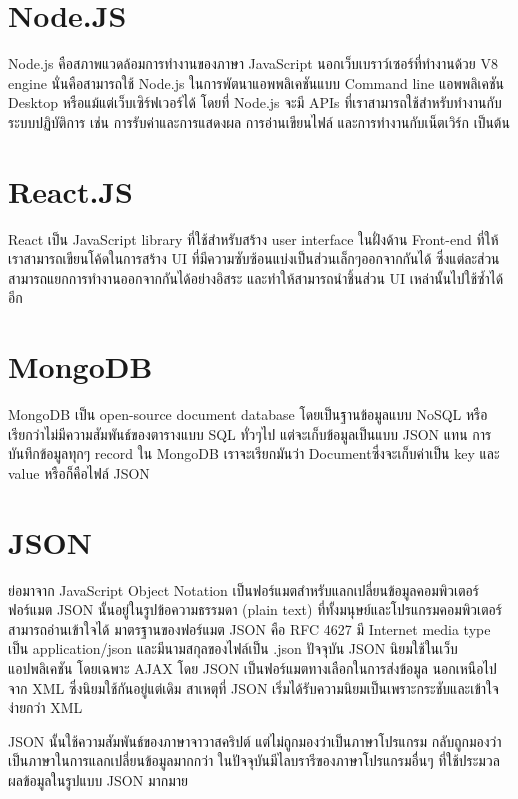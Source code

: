 \section{Node.JS}
Node.js คือสภาพแวดล้อมการทำงานของภาษา JavaScript นอกเว็บเบราว์เซอร์ที่ทำงานด้วย V8 engine นั่นคือสามารถใช้ Node.js ในการพัตนาแอพพลิเคชันแบบ Command line แอพพลิเคชัน Desktop หรือแม้แต่เว็บเซิร์ฟเวอร์ได้ 
โดยที่ Node.js จะมี APIs ที่เราสามารถใช้สำหรับทำงานกับระบบปฏิบัติการ เช่น การรับค่าและการแสดงผล การอ่านเขียนไฟล์ และการทำงานกับเน็ตเวิร์ก เป็นต้น

\section{React.JS}
React เป็น JavaScript library ที่ใช้สำหรับสร้าง user interface ในฝั่งด้าน Front-end ที่ให้เราสามารถเขียนโค้ดในการสร้าง UI ที่มีความซับซ้อนแบ่งเป็นส่วนเล็กๆออกจากกันได้ ซึ่งแต่ละส่วนสามารถแยกการทำงานออกจากกันได้อย่างอิสระ 
และทำให้สามารถนำชิ้นส่วน UI เหล่านั้นไปใช้ซ้ำได้อีก

\section{MongoDB}
MongoDB เป็น open-source document database โดยเป็นฐานข้อมูลแบบ NoSQL หรือเรียกว่าไม่มีความสัมพันธ์ของตารางแบบ SQL ทั่วๆไป แต่จะเก็บข้อมูลเป็นแบบ JSON แทน การบันทึกข้อมูลทุกๆ record ใน MongoDB 
เราจะเรียกมันว่า Documentซึ่งจะเก็บค่าเป็น key และ value หรือก็คือไฟล์ JSON

\section{JSON}
ย่อมาจาก JavaScript Object Notation เป็นฟอร์แมตสำหรับแลกเปลี่ยนข้อมูลคอมพิวเตอร์ \\ ฟอร์แมต JSON นั้นอยู่ในรูปข้อความธรรมดา (plain text) ที่ทั้งมนุษย์และโปรแกรมคอมพิวเตอร์สามารถอ่านเข้าใจได้ 
มาตรฐานของฟอร์แมต JSON คือ RFC 4627 มี Internet media type เป็น application/json และมีนามสกุลของไฟล์เป็น .json
ปัจจุบัน JSON นิยมใช้ในเว็บแอปพลิเคชัน โดยเฉพาะ AJAX โดย JSON เป็นฟอร์แมตทางเลือกในการส่งข้อมูล นอกเหนือไปจาก XML ซึ่งนิยมใช้กันอยู่แต่เดิม สาเหตุที่ JSON เริ่มได้รับความนิยมเป็นเพราะกระชับและเข้าใจง่ายกว่า XML

JSON นั้นใช้ความสัมพันธ์ของภาษาจาวาสคริปต์ แต่ไม่ถูกมองว่าเป็นภาษาโปรแกรม กลับถูกมองว่าเป็นภาษาในการแลกเปลี่ยนข้อมูลมากกว่า ในปัจจุบันมีไลบรารีของภาษาโปรแกรมอื่นๆ ที่ใช้ประมวลผลข้อมูลในรูปแบบ JSON มากมาย







